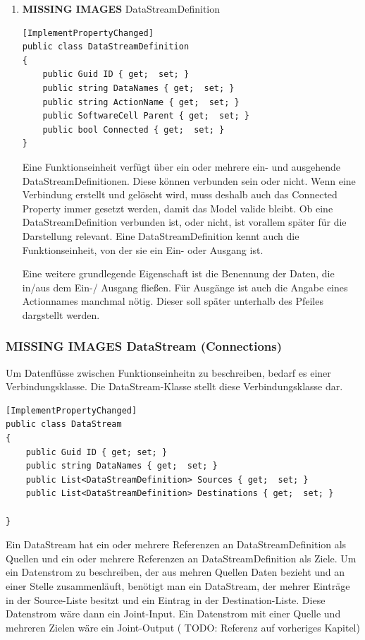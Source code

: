 \documentclass[11pt]{article}
\begin{document}
\begin{enumerate}
\item {\bfseries\sffamily MISSING IMAGES} DataStreamDefinition
\label{sec:orgheadline7}

\begin{verbatim}
[ImplementPropertyChanged]
public class DataStreamDefinition
{
    public Guid ID { get;  set; }
    public string DataNames { get;  set; }
    public string ActionName { get;  set; }
    public SoftwareCell Parent { get;  set; }
    public bool Connected { get;  set; }
}
\end{verbatim}

Eine Funktionseinheit verfügt über ein oder mehrere ein- und ausgehende
DataStreamDefinitionen. Diese können verbunden sein oder nicht. Wenn eine
Verbindung erstellt und gelöscht wird, muss deshalb auch das Connected
Property immer gesetzt werden, damit das Model valide bleibt.
Ob eine DataStreamDefinition verbunden ist, oder nicht, ist vorallem später
für die Darstellung relevant.
Eine DataStreamDefinition kennt auch die Funktionseinheit, von der sie ein
Ein- oder Ausgang ist.

Eine weitere grundlegende Eigenschaft ist die Benennung der Daten, die in/aus
dem Ein-/ Ausgang fließen. Für Ausgänge ist auch die Angabe eines
Actionnames manchmal nötig. Dieser soll später unterhalb des Pfeiles
dargstellt werden.
\end{enumerate}

\subsubsection{{\bfseries\sffamily MISSING IMAGES} DataStream (Connections)}
\label{sec:orgheadline9}
Um Datenflüsse zwischen Funktionseinheitn zu beschreiben, bedarf es einer
Verbindungsklasse. Die DataStream-Klasse stellt diese Verbindungsklasse dar.


\begin{verbatim}
[ImplementPropertyChanged]
public class DataStream
{
    public Guid ID { get; set; }
    public string DataNames { get;  set; }
    public List<DataStreamDefinition> Sources { get;  set; }
    public List<DataStreamDefinition> Destinations { get;  set; }

}
\end{verbatim}

Ein DataStream hat ein oder mehrere Referenzen an DataStreamDefinition als
Quellen und ein oder mehrere Referenzen an DataStreamDefinition als Ziele.
Um ein Datenstrom zu beschreiben, der aus mehren Quellen Daten bezieht und
an einer Stelle zusammenläuft, benötigt man ein DataStream, der mehrer
Einträge in der Source-Liste besitzt und ein Eintrag in der
Destination-Liste. Diese Datenstrom wäre dann ein Joint-Input.
Ein Datenstrom mit einer Quelle und mehreren Zielen wäre ein Joint-Output ( TODO:
Referenz auf vorheriges Kapitel)
\end{document}
